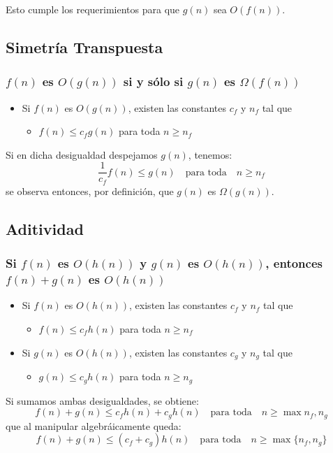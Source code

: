 \documentclass[letterpaper]{article}
\begin{document}
\noindent
Esto cumple los requerimientos para que \(g(n)\) sea \(O(f(n))\).
\subsection{Simetría Transpuesta}
\label{sec:orgc1f3492}
\subsubsection{\(f(n)\) es \(O(g(n))\) si y sólo si \(g(n)\) es \(\Omega(f(n))\)}
\label{sec:org4b4a0c3}
\begin{itemize}
\item Si \(f(n)\) es \(O(g(n))\), existen las constantes \(c_f\) y \(n_f\) tal que
\begin{itemize}
\item \(f(n) \leq c_f g(n)\) para toda \(n \geq n_f\)
\end{itemize}
\end{itemize}

\noindent
Si en dicha desigualdad despejamos \(g(n)\), tenemos:
$$
\frac{1}{c_f} f(n) \leq g(n) \quad \mbox{para toda} \quad n \geq n_f
$$
se observa entonces, por definición, que \(g(n)\) es \(\Omega(g(n))\).
\subsection{Aditividad}
\label{sec:orgc3c608e}
\subsubsection{Si \(f(n)\) es \(O(h(n))\) y \(g(n)\) es \(O(h(n))\), entonces \(f(n)+g(n)\) es \(O(h(n))\)}
\label{sec:orga56e7a1}
\begin{itemize}
\item Si \(f(n)\) es \(O(h(n))\), existen las constantes \(c_f\) y \(n_f\) tal que
\begin{itemize}
\item \(f(n) \leq c_f h(n)\) para toda \(n \geq n_f\)
\end{itemize}
\item Si \(g(n)\) es \(O(h(n))\), existen las constantes \(c_g\) y \(n_g\) tal que
\begin{itemize}
\item \(g(n) \leq c_g h(n)\) para toda \(n \geq n_g\)
\end{itemize}
\end{itemize}

\noindent
Si sumamos ambas desigualdades, se obtiene:
$$
f(n) + g(n) \leq c_f h(n) + c_g h(n) \quad \mbox{para toda} \quad
n \geq \max{n_f, n_g}
$$
que al manipular algebráicamente queda:
$$
f(n) + g(n) \leq (c_f + c_g) h(n) \quad \mbox{para toda} \quad
n \geq \max\{n_f, n_g\}
$$
\end{document}
